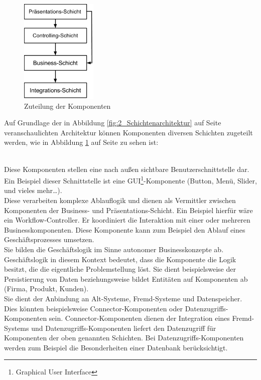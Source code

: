 \begin{figure}[h]
\centering
\includegraphics[height=5.0cm]{images/Schichtenarchitektur.png}
\caption[
Zuteilung der Komponenten
]{Zuteilung der Komponenten}
\label{fig:2_Schichtenarchitektur2}
\end{figure}

Auf Grundlage der in Abbildung \ref{fig:2_Schichtenarchitektur} auf Seite \pageref{fig:2_Schichtenarchitektur} veranschaulichten Architektur können Komponenten diversen Schichten zugeteilt werden, wie in Abbildung \ref{fig:2_Schichtenarchitektur2} auf Seite \pageref{fig:2_Schichtenarchitektur2} zu sehen ist:
\begin{enumerate}
 \hfill \\
Diese Komponenten stellen eine nach außen sichtbare Benutzerschnittstelle dar. Ein Beispiel dieser Schnittstelle ist eine GUI\footnote{Graphical User Interface}-Komponente (Button, Menü, Slider, und vieles mehr\ldots).
 \hfill \\
Diese verarbeiten komplexe Ablauflogik und dienen als Vermittler zwischen Komponenten der Business- und Präsentations-Schicht. Ein Beispiel hierfür wäre ein Workflow-Controller. Er koordiniert die Interaktion mit einer oder mehreren Businesskomponenten. Diese Komponente kann zum Beispiel den Ablauf eines Geschäftsprozesses umsetzen.
 \hfill \\
Sie bilden die Geschäftslogik im Sinne autonomer Businesskonzepte ab. Geschäftslogik in diesem Kontext bedeutet, dass die Komponente die Logik besitzt, die die eigentliche Problemstellung löst. Sie dient beispielsweise der Persistierung von Daten beziehungsweise bildet Entitäten auf Komponenten ab (Firma, Produkt, Kunden).
 \hfill \\
Sie dient der Anbindung an Alt-Systeme, Fremd-Systeme und Datenspeicher. Dies könnten beispielsweise Connector-Komponenten oder Datenzugriffs-Komponenten sein. Connector-Komponenten dienen der Integration eines Fremd-Systems und Datenzugriffs-Komponenten liefert den Datenzugriff für Komponenten der oben genannten Schichten. Bei Datenzugriffs-Komponenten werden zum Beispiel die Besonderheiten einer Datenbank berücksichtigt.
\end{enumerate}

